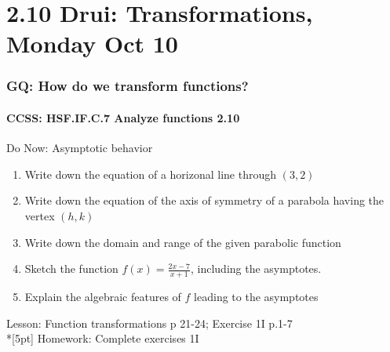 \documentclass{beamer}
\begin{document}
\section{2.10 Drui: Transformations, Monday Oct 10}
  \frame
  {
    \frametitle{GQ: How do we transform functions?}
    \framesubtitle{CCSS: HSF.IF.C.7 Analyze functions    \alert{2.10}}

    \begin{block}{Do Now: Asymptotic behavior}
    \begin{enumerate}
        \item Write down the equation of a horizonal line through $(3,2)$
        \item Write down the equation of the axis of symmetry of a parabola having the vertex $(h,k)$
        \item Write down the domain and range of the given parabolic function
        \item Sketch the function $\displaystyle f(x)=\frac{2x-7}{x+1}$, including the asymptotes.
        \item Explain the algebraic features of $f$ leading to the asymptotes
    \end{enumerate}
    \end{block}
    Lesson: Function transformations p 21-24; Exercise 1I p.1-7 \\*[5pt]
    Homework: Complete exercises 1I
  }
\end{document}
